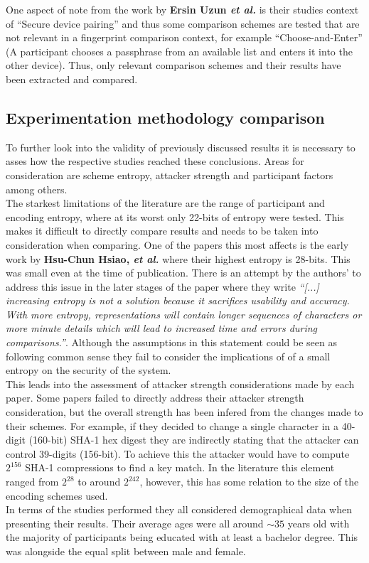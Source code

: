 One aspect of note from the work by \textbf{Ersin Uzun \textit{et al.}}\cite{uzun2007usability} is their studies context  of  “Secure  device  pairing”  and  thus  some comparison schemes are tested that are not relevant in a fingerprint comparison context, for example “Choose-and-Enter” (A participant chooses a passphrase from an available list and enters it into the other device).  Thus, only relevant comparison schemes and their results have been extracted and compared. \\


\subsection*{Experimentation methodology comparison}
To further look into the validity of previously discussed results it is necessary to asses how the respective studies reached these conclusions. Areas for consideration are scheme entropy, attacker strength and participant factors among others.\\
The starkest limitations of the literature are the range of participant and encoding entropy, where at its worst only 22-bits of entropy were tested. This makes it difficult to directly compare results and needs to be taken into consideration when comparing.
One of the papers this most affects is the early work by \textbf{Hsu-Chun Hsiao, \textit{et al.}} where their highest entropy is 28-bits. This was small even at the time of publication. There is an attempt by the authors' to address this issue in the later stages of the paper where they write \textit{``[...] increasing entropy is not a solution because it sacrifices usability and accuracy. With more entropy, representations will contain longer sequences of characters or more minute details which will lead to increased time and errors during comparisons.''}. Although the assumptions in this statement could be seen as following common sense they fail to consider the implications of of a small entropy on the security of the system.
\\
This leads into the assessment of attacker strength considerations made by each paper. Some papers failed to directly address their attacker strength consideration, but the overall strength has been infered from the changes made to their schemes. For example, if they decided to change a single character in a 40-digit (160-bit) SHA-1 hex digest they are indirectly stating that the attacker can control 39-digits (156-bit). To achieve this the attacker would have to compute $2^{156}$ SHA-1 compressions to find a key match.
In the literature this element ranged from $2^{28}$ to around $2^{242}$, however, this has some relation to the size of the encoding schemes used.
\\
In terms of the studies performed they all considered demographical data when presenting their results. Their average ages were all around $\sim35$ years old with the majority of participants being educated with at least a bachelor degree. This was alongside the equal split between male and female.

